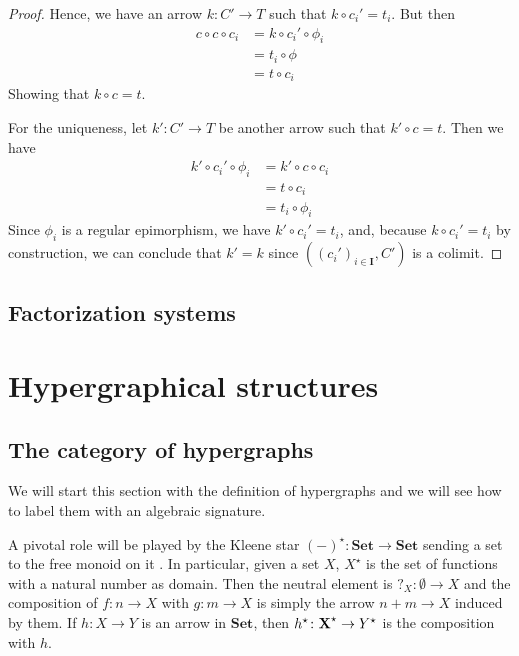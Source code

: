 \documentclass[runningheads,envcountsect]{llncs}
\newcommand{\cat}[1]{\ensuremath{\mathbf{#1}}}
\newcommand{\Set}{\mathbf{Set}}
\def\X{\textbf {\textup{X}}}
\begin{document}
\begin{proof}
    Hence, we have an arrow $k: C' \to T$ such that $k \circ c_i' = t_i$. But then
    \begin{align*}
        c \circ c \circ c_i &= k \circ c_i' \circ \phi_i \\
                            &= t_i \circ \phi \\
                            &= t \circ c_i
    \end{align*}
    Showing that $k \circ c = t$.

    For the uniqueness, let $k': C' \to T$ be another arrow such that $k' \circ c = t$. Then we have
    \begin{align*}
        k' \circ c_i' \circ \phi_i &= k' \circ c \circ c_i \\
                                   &= t \circ c_i \\
                                   &= t_i \circ \phi_i
    \end{align*}    
    Since $\phi_i$ is a regular epimorphism, we have $k' \circ c_i' = t_i$, and, because $k \circ c_i' = t_i$ by construction, we can conclude that $k'=k$ since $((c_i')_{i \in \cat I}, C')$ is a colimit.
\end{proof}

\subsection{Factorization systems}
\fi 



\section{Hypergraphical structures}

\subsection{The category of hypergraphs}


We will start this section with the definition of hypergraphs and we will see how to label them with an algebraic signature. 

A pivotal role will be played by the Kleene star $(-)^\star\colon \Set\to \Set$ sending a set to the free monoid on it \cite{...}. In particular, given a set $X$, $X^\star$ is the set of functions with a natural number as domain. Then the neutral element is $?_X\colon \emptyset \to X$ and the composition of $f\colon n\to X$ with $g\colon m\to X$ is simply the arrow $n+m\to X$ induced by them. If $h\colon X\to Y$ is an arrow in $\Set$, then $h^\star \colon \X^\star\to Y^\star$ is the composition with $h$.
\end{document}
